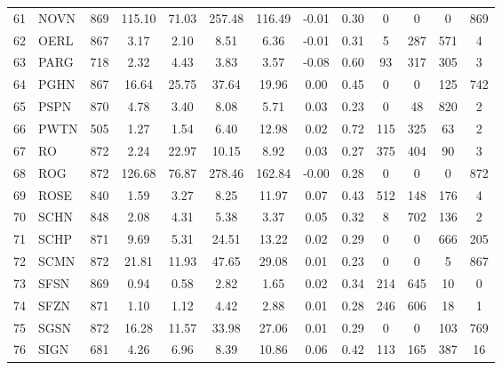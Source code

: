 \documentclass[11pt,a4paper]{article}
\begin{document}
\begin{doublespacing}
\begin{small}
\begin{longtable}{llc|cc|cc|cc|cccc}
                61  & NOVN  & 869 & 115.10 & 71.03    & 257.48 & 116.49   & -0.01 & 0.30     & 0     & 0     & 0     & 869   \\
                62  & OERL  & 867 & 3.17   & 2.10     & 8.51   & 6.36     & -0.01 & 0.31     & 5     & 287   & 571   & 4     \\
                63  & PARG  & 718 & 2.32   & 4.43     & 3.83   & 3.57     & -0.08 & 0.60     & 93    & 317   & 305   & 3     \\
                64  & PGHN  & 867 & 16.64  & 25.75    & 37.64  & 19.96    & 0.00  & 0.45     & 0     & 0     & 125   & 742   \\
                65  & PSPN  & 870 & 4.78   & 3.40     & 8.08   & 5.71     & 0.03  & 0.23     & 0     & 48    & 820   & 2     \\
                66  & PWTN  & 505 & 1.27   & 1.54     & 6.40   & 12.98    & 0.02  & 0.72     & 115   & 325   & 63    & 2     \\
                67  & RO    & 872 & 2.24   & 22.97    & 10.15  & 8.92     & 0.03  & 0.27     & 375   & 404   & 90    & 3     \\
                68  & ROG   & 872 & 126.68 & 76.87    & 278.46 & 162.84   & -0.00 & 0.28     & 0     & 0     & 0     & 872   \\
                69  & ROSE  & 840 & 1.59   & 3.27     & 8.25   & 11.97    & 0.07  & 0.43     & 512   & 148   & 176   & 4     \\
                70  & SCHN  & 848 & 2.08   & 4.31     & 5.38   & 3.37     & 0.05  & 0.32     & 8     & 702   & 136   & 2     \\
                71  & SCHP  & 871 & 9.69   & 5.31     & 24.51  & 13.22    & 0.02  & 0.29     & 0     & 0     & 666   & 205   \\
                72  & SCMN  & 872 & 21.81  & 11.93    & 47.65  & 29.08    & 0.01  & 0.23     & 0     & 0     & 5     & 867   \\
                73  & SFSN  & 869 & 0.94   & 0.58     & 2.82   & 1.65     & 0.02  & 0.34     & 214   & 645   & 10    & 0     \\
                74  & SFZN  & 871 & 1.10   & 1.12     & 4.42   & 2.88     & 0.01  & 0.28     & 246   & 606   & 18    & 1     \\
                75  & SGSN  & 872 & 16.28  & 11.57    & 33.98  & 27.06    & 0.01  & 0.29     & 0     & 0     & 103   & 769   \\
                76  & SIGN  & 681 & 4.26   & 6.96     & 8.39   & 10.86    & 0.06  & 0.42     & 113   & 165   & 387   & 16    \\

\end{longtable}
\end{small}
\end{doublespacing}
\end{document}
